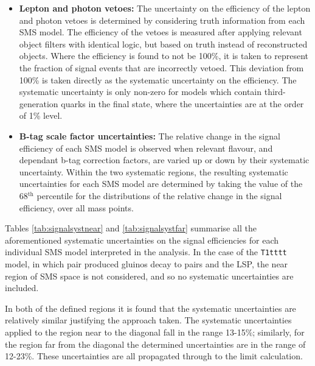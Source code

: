 \begin{itemize}
\item[]\textbf{Lepton and photon vetoes:} 
The uncertainty on the efficiency of the lepton and photon vetoes is determined by considering truth information from each \ac{SMS} model. The efficiency of the vetoes is measured after applying relevant object filters with identical logic, but based on truth instead of reconstructed objects. Where the efficiency is found to not be 100\%, it is taken to represent the fraction of signal events that are incorrectly vetoed. This deviation from 100\% is taken directly as the systematic uncertainty on the efficiency. The systematic uncertainty is only non-zero for models which contain third-generation quarks in the final state, where the uncertainties are at the order of 1\% level.
\item[]\textbf{B-tag scale factor uncertainties:} 
The relative change in the signal efficiency of each \ac{SMS} model is observed when relevant flavour, \pt and \eta dependant b-tag correction factors, are varied up or down by their systematic uncertainty. Within the two systematic regions, the resulting systematic uncertainties for each \ac{SMS} model are determined by taking the value of the 68$^{\text{th}}$ percentile for the distributions of the relative change in the signal efficiency, over all mass points.
\end{itemize}

Tables \ref{tab:signalsystnear} and \ref{tab:signalsystfar} summarise all the aforementioned systematic uncertainties on the signal efficiencies for each individual \ac{SMS} model interpreted in the analysis. In the case of the \texttt{T1tttt} model, in which pair produced gluinos decay to \ttbar pairs and the \ac{LSP}, the near region of \ac{SMS} space is not considered, and so no systematic uncertainties are included.

In both of the defined regions it is found that the systematic uncertainties are relatively similar justifying the approach taken. The systematic uncertainties applied to the region near to the diagonal fall in the range 13-15\%; similarly, for the region far from the diagonal the determined uncertainties are in the range of 12-23\%. These uncertainties are all propagated through to the limit calculation.

